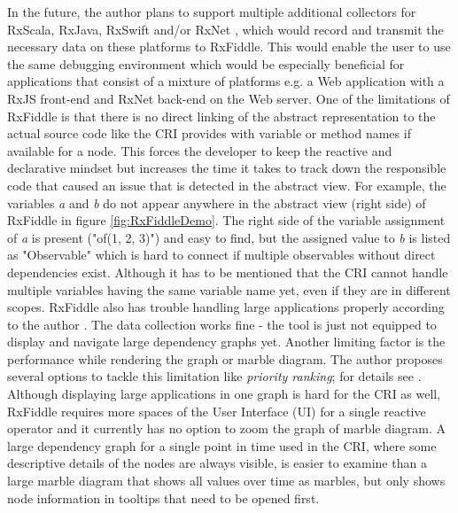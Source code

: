 	In the future, the author plans to support multiple additional collectors for RxScala, RxJava, RxSwift and/or RxNet \cite{RxFiddleTutorials}, which would record and transmit the necessary data on these platforms to RxFiddle. This would enable the user to use the same debugging environment which would be especially beneficial for applications that consist of a mixture of platforms e.g. a Web application with a RxJS front-end and RxNet back-end on the Web server.
	One of the limitations of RxFiddle is that there is no direct linking of the abstract representation to the actual source code like the CRI provides with variable or method names if available for a node. This forces the developer to keep the reactive and declarative mindset but increases the time it takes to track down the responsible code that caused an issue that is detected in the abstract view. For example, the variables \emph{a} and \emph{b} do not appear anywhere in the abstract view (right side) of RxFiddle in figure \ref{fig:RxFiddleDemo}. The right side of the variable assignment of \emph{a} is present ("of(1, 2, 3)") and easy to find, but the assigned value to \emph{b} is listed as "Observable" which is hard to connect if multiple observables without direct dependencies exist. Although it has to be mentioned that the CRI cannot handle multiple variables having the same variable name yet, even if they are in different scopes.
	RxFiddle also has trouble handling large applications properly according to the author \cite[Issue 6]{RxFiddleGitHub}. The data collection works fine - the tool is just not equipped to display and navigate large dependency graphs yet. Another limiting factor is the performance while rendering the graph or marble diagram. The author proposes several options to tackle this limitation like \emph{priority ranking}; for details see \cite[Issue 6]{RxFiddleGitHub}. Although displaying large applications in one graph is hard for the CRI as well, RxFiddle requires more spaces of the User Interface (UI) for a single reactive operator and it currently has no option to zoom the graph of marble diagram. A large dependency graph for a single point in time used in the CRI, where some descriptive details of the nodes are always visible, is easier to examine than a large marble diagram that shows all values over time as marbles, but only shows node information in tooltips that need to be opened first.
